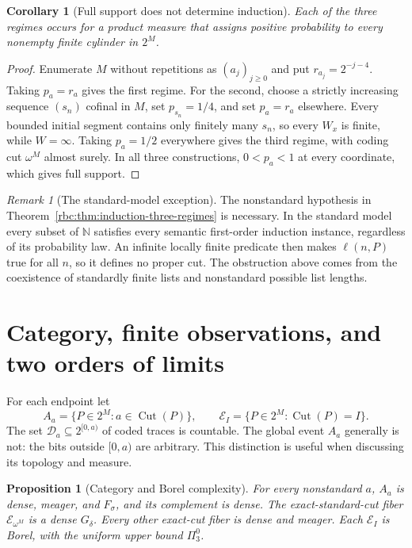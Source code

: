 \documentclass[11pt]{article}
\numberwithin{equation}{section}
\newtheorem{proposition}[theorem]{Proposition}
\newtheorem{corollary}[theorem]{Corollary}
\theoremstyle{definition}
\theoremstyle{remark}
\newtheorem{remark}[theorem]{Remark}
\newcommand{\N}{\mathbb N}
\newcommand{\std}{\omega^M}
\newcommand{\Cut}{\operatorname{Cut}}
\newcommand{\coded}{\mathcal D}
\begin{document}
\begin{corollary}[Full support does not determine induction]
\label{rbc:cor:induction-full-support}
Each of the three regimes occurs for a product measure that assigns
positive probability to every nonempty finite cylinder in $2^M$.
\end{corollary}

\begin{proof}
Enumerate $M$ without repetitions as $(a_j)_{j\ge0}$ and put
$r_{a_j}=2^{-j-4}$.  Taking $p_a=r_a$ gives the first regime.
For the second, choose a strictly increasing sequence $(s_n)$
cofinal in $M$, set $p_{s_n}=1/4$, and set $p_a=r_a$ elsewhere.
Every bounded initial segment contains only finitely many $s_n$,
so every $W_x$ is finite, while $W=\infty$.
Taking $p_a=1/2$ everywhere gives the third regime, with coding cut
$\std$ almost surely.  In all three constructions,
$0<p_a<1$ at every coordinate, which gives full support.
\end{proof}

\begin{remark}[The standard-model exception]
The nonstandard hypothesis in
Theorem~\ref{rbc:thm:induction-three-regimes} is necessary.  In the
standard model every subset of $\N$ satisfies every semantic
first-order induction instance, regardless of its probability law.
An infinite locally finite predicate then makes $\ell(n,P)$ true
for all $n$, so it defines no proper cut.  The obstruction above
comes from the coexistence of standardly finite lists and
nonstandard possible list lengths.
\end{remark}



\section{Category, finite observations, and two orders of limits}
\label{rbc:sec:regularity}

For each endpoint let
\[
 A_a=\{P\in2^M:a\in\Cut(P)\},\qquad
 \mathcal E_I=\{P\in2^M:\Cut(P)=I\}.
\]
The set $\coded_a\subseteq2^{[0,a)}$ of coded traces is countable. The
global event $A_a$ generally is not: the bits outside $[0,a)$ are arbitrary.
This distinction is useful when discussing its topology and measure.

\begin{proposition}[Category and Borel complexity]
\label{rbc:prop:category}
For every nonstandard $a$, $A_a$ is dense, meager, and $F_\sigma$, and its
complement is dense. The exact-standard-cut fiber $\mathcal E_{\std}$ is a
dense $G_\delta$. Every other exact-cut fiber is dense and meager. Each
$\mathcal E_I$ is Borel, with the uniform upper bound $\Pi^0_3$.
\end{proposition}
\end{document}
